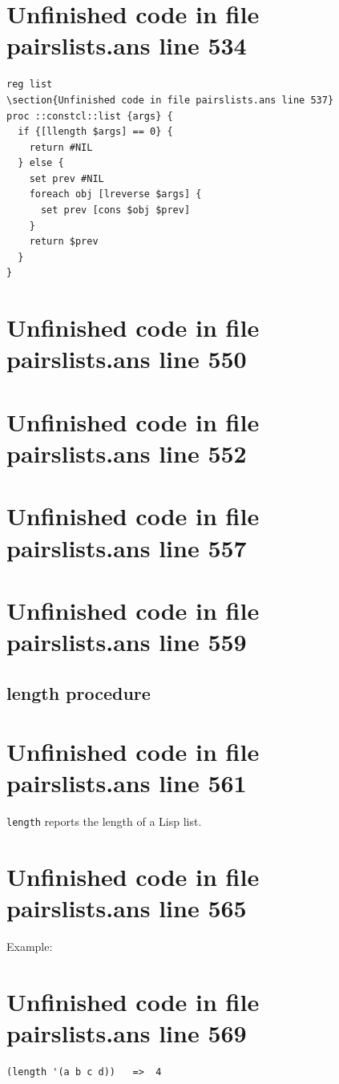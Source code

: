 \documentclass[twoside,9pt]{report}
\begin{document}
\section{Unfinished code in file pairslists.ans line 534}
\begin{lstlisting}
reg list
\section{Unfinished code in file pairslists.ans line 537}
proc ::constcl::list {args} {
  if {[llength $args] == 0} {
    return #NIL
  } else {
    set prev #NIL
    foreach obj [lreverse $args] {
      set prev [cons $obj $prev]
    }
    return $prev
  }
}
\end{lstlisting}
\section{Unfinished code in file pairslists.ans line 550}
\section{Unfinished code in file pairslists.ans line 552}
\section{Unfinished code in file pairslists.ans line 557}
\section{Unfinished code in file pairslists.ans line 559}
\subsection{length procedure}
\label{length-procedure}
\section{Unfinished code in file pairslists.ans line 561}


\texttt{length} reports the length of a Lisp list.

\section{Unfinished code in file pairslists.ans line 565}


Example:

\section{Unfinished code in file pairslists.ans line 569}
\begin{verbatim}
(length '(a b c d))   =>  4
\end{verbatim}
\end{document}
